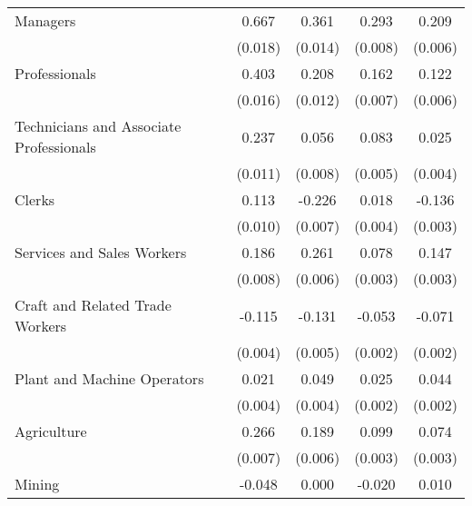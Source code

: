 \begin{table}[htbp]
\begin{tabular}{l*{4}{c}}
Managers            &       0.667\sym{***}&       0.361\sym{***}&       0.293\sym{***}&       0.209\sym{***}\\
                    &     (0.018)         &     (0.014)         &     (0.008)         &     (0.006)         \\
Professionals       &       0.403\sym{***}&       0.208\sym{***}&       0.162\sym{***}&       0.122\sym{***}\\
                    &     (0.016)         &     (0.012)         &     (0.007)         &     (0.006)         \\
Technicians and Associate Professionals&       0.237\sym{***}&       0.056\sym{***}&       0.083\sym{***}&       0.025\sym{***}\\
                    &     (0.011)         &     (0.008)         &     (0.005)         &     (0.004)         \\
Clerks              &       0.113\sym{***}&      -0.226\sym{***}&       0.018\sym{***}&      -0.136\sym{***}\\
                    &     (0.010)         &     (0.007)         &     (0.004)         &     (0.003)         \\
Services and Sales Workers&       0.186\sym{***}&       0.261\sym{***}&       0.078\sym{***}&       0.147\sym{***}\\
                    &     (0.008)         &     (0.006)         &     (0.003)         &     (0.003)         \\
Craft and Related Trade Workers&      -0.115\sym{***}&      -0.131\sym{***}&      -0.053\sym{***}&      -0.071\sym{***}\\
                    &     (0.004)         &     (0.005)         &     (0.002)         &     (0.002)         \\
Plant and Machine Operators&       0.021\sym{***}&       0.049\sym{***}&       0.025\sym{***}&       0.044\sym{***}\\
                    &     (0.004)         &     (0.004)         &     (0.002)         &     (0.002)         \\
Agriculture         &       0.266\sym{***}&       0.189\sym{***}&       0.099\sym{***}&       0.074\sym{***}\\
                    &     (0.007)         &     (0.006)         &     (0.003)         &     (0.003)         \\
Mining              &      -0.048\sym{***}&       0.000         &      -0.020\sym{***}&       0.010\sym{***}\\

\end{tabular}
\end{table}
